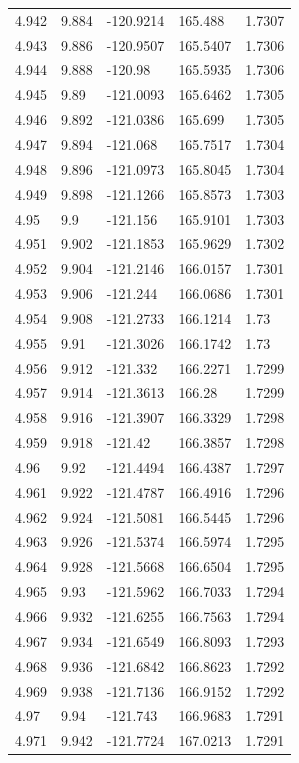 \begin{tabular}{lllll}
4.942 & 9.884 & -120.9214 & 165.488 & 1.7307 \\
4.943 & 9.886 & -120.9507 & 165.5407 & 1.7306 \\
4.944 & 9.888 & -120.98 & 165.5935 & 1.7306 \\
4.945 & 9.89 & -121.0093 & 165.6462 & 1.7305 \\
4.946 & 9.892 & -121.0386 & 165.699 & 1.7305 \\
4.947 & 9.894 & -121.068 & 165.7517 & 1.7304 \\
4.948 & 9.896 & -121.0973 & 165.8045 & 1.7304 \\
4.949 & 9.898 & -121.1266 & 165.8573 & 1.7303 \\
4.95 & 9.9 & -121.156 & 165.9101 & 1.7303 \\
4.951 & 9.902 & -121.1853 & 165.9629 & 1.7302 \\
4.952 & 9.904 & -121.2146 & 166.0157 & 1.7301 \\
4.953 & 9.906 & -121.244 & 166.0686 & 1.7301 \\
4.954 & 9.908 & -121.2733 & 166.1214 & 1.73 \\
4.955 & 9.91 & -121.3026 & 166.1742 & 1.73 \\
4.956 & 9.912 & -121.332 & 166.2271 & 1.7299 \\
4.957 & 9.914 & -121.3613 & 166.28 & 1.7299 \\
4.958 & 9.916 & -121.3907 & 166.3329 & 1.7298 \\
4.959 & 9.918 & -121.42 & 166.3857 & 1.7298 \\
4.96 & 9.92 & -121.4494 & 166.4387 & 1.7297 \\
4.961 & 9.922 & -121.4787 & 166.4916 & 1.7296 \\
4.962 & 9.924 & -121.5081 & 166.5445 & 1.7296 \\
4.963 & 9.926 & -121.5374 & 166.5974 & 1.7295 \\
4.964 & 9.928 & -121.5668 & 166.6504 & 1.7295 \\
4.965 & 9.93 & -121.5962 & 166.7033 & 1.7294 \\
4.966 & 9.932 & -121.6255 & 166.7563 & 1.7294 \\
4.967 & 9.934 & -121.6549 & 166.8093 & 1.7293 \\
4.968 & 9.936 & -121.6842 & 166.8623 & 1.7292 \\
4.969 & 9.938 & -121.7136 & 166.9152 & 1.7292 \\
4.97 & 9.94 & -121.743 & 166.9683 & 1.7291 \\
4.971 & 9.942 & -121.7724 & 167.0213 & 1.7291 \\

\end{tabular}
